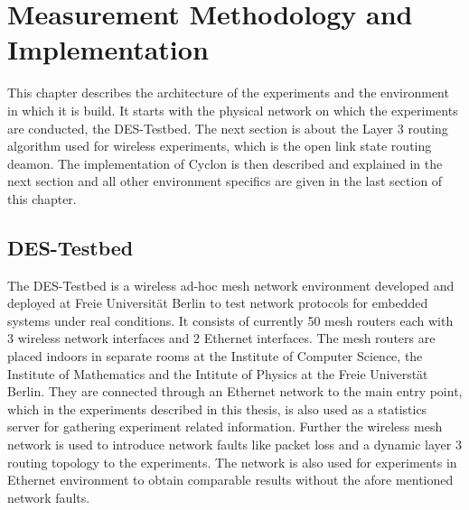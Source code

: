 \chapter{Measurement Methodology and Implementation} 
\label{chap:methodology}
This chapter describes the architecture of the experiments and the environment
in which it is build. It starts with the physical network on which the
experiments are conducted, the DES-Testbed. The next section is about the Layer
3 routing algorithm used for wireless experiments, which is the open link state
routing deamon. The implementation of Cyclon is then described and
explained in the next section and all other environment specifics are given in
the last section of this chapter.

\section{DES-Testbed}
The DES-Testbed \cite{blywis2011properties} is a wireless ad-hoc mesh network
environment developed and deployed at Freie Universität Berlin to test network protocols for embedded
systems under real conditions. It consists of currently 50 mesh routers each
with 3 wireless network interfaces and 2 Ethernet interfaces. The mesh routers
are placed indoors in separate rooms at the Institute of Computer
Science, the Institute of Mathematics and the Intitute of Physics at the Freie Universtät
Berlin. They are connected through an Ethernet network to the main entry point,
which in the experiments described in this thesis, is also used as a statistics
server for gathering experiment related information. Further the wireless mesh
network is used to introduce network faults like packet loss and a
dynamic layer 3 routing topology to the experiments. The network is also used
for experiments in Ethernet environment to obtain comparable results without the
afore mentioned network faults.
%

